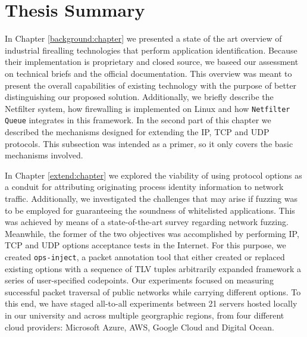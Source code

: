 \section{Thesis Summary}
\label{conclusion:summary}

In Chapter \ref{background:chapter} we presented a state of the art overview of
industrial firealling technologies that perform application identification.
Because their implementation is proprietary and closed source, we baseed our
assessment on technical briefs and the official documentation. This overview was
meant to present the overall capabilities of existing technology with the
purpose of better distinguishing our proposed solution. Additionally, we
briefly describe the Netfilter system, how firewalling is implemented on Linux
and how \texttt{Netfilter Queue} integrates in this framework. In the second
part of this chapter we described the mechanisms designed for extending the IP,
TCP and UDP protocols. This subsection was intended as a primer, so it only
covers the basic mechanisms involved.

In Chapter \ref{extend:chapter} we explored the viability of using protocol
options as a conduit for attributing originating process identity information
to network traffic. Additionally, we investigated the challenges that may arise
if fuzzing was to be employed for guaranteeing the soundness of whitelisted
applications. This was achieved by means of a state-of-the-art survey regarding
network fuzzing. Meanwhile, the former of the two objectives was accomplished by
performing IP, TCP and UDP options acceptance tests in the Internet. For this
purpose, we created \texttt{ops-inject}, a packet annotation tool that either
created or replaced existing options with a sequence of TLV tuples arbitrarily expanded
framework a series of user-specified codepoints. Our experiments focused on measuring
successful packet traversal of public networks while carrying different options.
To this end, we have staged all-to-all experiments between 21 servers hosted
locally in our university and across multiple georgraphic regions, from four
different cloud providers: Microsoft Azure, AWS, Google Cloud and Digital Ocean.

